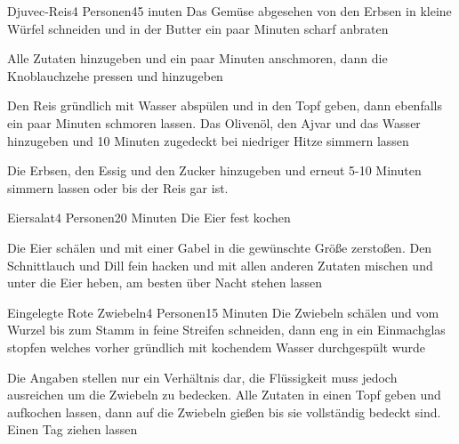 
\begin{recipe}{Djuvec-Reis}{4 Personen}{45 inuten}
Das Gemüse abgesehen von den Erbsen in kleine Würfel schneiden und in der Butter ein paar Minuten scharf anbraten

Alle Zutaten hinzugeben und ein paar Minuten anschmoren, dann die Knoblauchzehe pressen und hinzugeben

Den Reis gründlich mit Wasser abspülen und in den Topf geben, dann ebenfalls ein paar Minuten schmoren lassen.
Das Olivenöl, den Ajvar und das Wasser hinzugeben und 10 Minuten zugedeckt bei niedriger Hitze simmern lassen

Die Erbsen, den Essig und den Zucker hinzugeben und erneut 5-10 Minuten simmern lassen oder bis der Reis gar ist.
\end{recipe}


\begin{recipe}{Eiersalat}{4 Personen}{20 Minuten}
Die Eier fest kochen

Die Eier schälen und mit einer Gabel in die gewünschte Größe zerstoßen. Den Schnittlauch und Dill fein hacken und mit allen anderen Zutaten mischen und unter die Eier heben, am besten über Nacht stehen lassen
\end{recipe}


\begin{recipe}{Eingelegte Rote Zwiebeln}{4 Personen}{15 Minuten}
Die Zwiebeln schälen und vom Wurzel bis zum Stamm in feine Streifen schneiden, dann eng in ein Einmachglas stopfen welches vorher gründlich mit kochendem Wasser durchgespült wurde

Die Angaben stellen nur ein Verhältnis dar, die Flüssigkeit muss jedoch ausreichen um die Zwiebeln zu bedecken.
Alle Zutaten in einen Topf geben und aufkochen lassen, dann auf die Zwiebeln gießen bis sie vollständig bedeckt sind. Einen Tag ziehen lassen
\end{recipe} 

